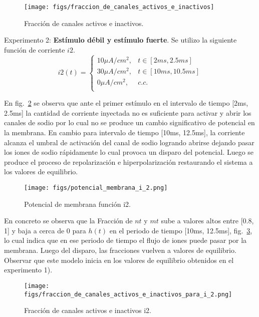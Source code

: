 \documentclass[aps,prl,twocolumn,groupedaddress]{revtex4-2}
\begin{document}
\begin{figure}[h!]
\centering
\texttt{[image: figs/fraccion\_de\_canales\_activos\_e\_inactivos]}
\caption{Fracción de canales activos e inactivos. \label{fig2}}
\end{figure}


Experimento 2: \textbf{Estímulo débil y estímulo fuerte}. Se utilizo la siguiente función de corriente $i2$.\\
$$
i2(t) = \left\{
\begin{array}{ll}
10 \mu A/cm^2, & t\in [2ms, 2.5ms] \\
30 \mu A/cm^2, & t\in [10ms, 10.5ms] \\
0 \mu A/cm^2, & c.c. \\
\end{array}
\right.
$$
 
En fig.~\ref{fig3} se observa que ante el primer estímulo en el intervalo de tiempo [2ms, 2.5ms] la cantidad de corriente inyectada no es suficiente para activar y abrir los canales de sodio por lo cual no se produce un cambio significativo de potencial en la membrana. En cambio para intervalo de tiempo [10ms, 12.5ms], la corriente alcanza el umbral de activación del canal de sodio logrando abrirse dejando pasar los iones de sodio rápidamente lo cual provoca un disparo del potencial. Luego se produce el proceso de repolarización e hiperpolarización  restaurando el sistema a los valores de equilibrio.\\


\begin{figure}[h!]
\centering
\texttt{[image: figs/potencial\_membrana\_i\_2.png]}
\caption{Potencial de membrana función i2. \label{fig3}}
\end{figure}

En concreto se observa que la Fracción de $nt$ y $mt$ sube a valores altos entre [0.8, 1] y baja a cerca de  0 para $h(t)$ en el periodo de tiempo [10ms, 12.5ms], 
fig.~\ref{fig4}, lo cual indica que en ese periodo de tiempo el flujo de iones puede pasar por la membrana.
Luego del disparo, las fracciones vuelven a valores de equilibrio.
Observar que este modelo inicia en los valores de equilibrio obtenidos en el experimento 1).\\



\begin{figure}[h!]
\centering
\texttt{[image: figs/fraccion\_de\_canales\_activos\_e\_inactivos\_para\_i\_2.png]}
\caption{Fracción de canales activos e inactivos i2. \label{fig4}}
\end{figure}
\end{document}
